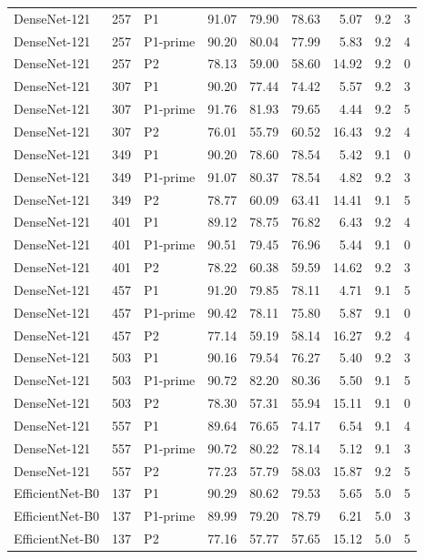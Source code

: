 {\begin{longtable}{lrlrrrrrr}
DenseNet-121 & 257 & P1 & 91.07 & 79.90 & 78.63 & 5.07 & 9.2 & 3 \\
DenseNet-121 & 257 & P1-prime & 90.20 & 80.04 & 77.99 & 5.83 & 9.2 & 4 \\
DenseNet-121 & 257 & P2 & 78.13 & 59.00 & 58.60 & 14.92 & 9.2 & 0 \\
DenseNet-121 & 307 & P1 & 90.20 & 77.44 & 74.42 & 5.57 & 9.2 & 3 \\
DenseNet-121 & 307 & P1-prime & 91.76 & 81.93 & 79.65 & 4.44 & 9.2 & 5 \\
DenseNet-121 & 307 & P2 & 76.01 & 55.79 & 60.52 & 16.43 & 9.2 & 4 \\
DenseNet-121 & 349 & P1 & 90.20 & 78.60 & 78.54 & 5.42 & 9.1 & 0 \\
DenseNet-121 & 349 & P1-prime & 91.07 & 80.37 & 78.54 & 4.82 & 9.2 & 3 \\
DenseNet-121 & 349 & P2 & 78.77 & 60.09 & 63.41 & 14.41 & 9.1 & 5 \\
DenseNet-121 & 401 & P1 & 89.12 & 78.75 & 76.82 & 6.43 & 9.2 & 4 \\
DenseNet-121 & 401 & P1-prime & 90.51 & 79.45 & 76.96 & 5.44 & 9.1 & 0 \\
DenseNet-121 & 401 & P2 & 78.22 & 60.38 & 59.59 & 14.62 & 9.2 & 3 \\
DenseNet-121 & 457 & P1 & 91.20 & 79.85 & 78.11 & 4.71 & 9.1 & 5 \\
DenseNet-121 & 457 & P1-prime & 90.42 & 78.11 & 75.80 & 5.87 & 9.1 & 0 \\
DenseNet-121 & 457 & P2 & 77.14 & 59.19 & 58.14 & 16.27 & 9.2 & 4 \\
DenseNet-121 & 503 & P1 & 90.16 & 79.54 & 76.27 & 5.40 & 9.2 & 3 \\
DenseNet-121 & 503 & P1-prime & 90.72 & 82.20 & 80.36 & 5.50 & 9.1 & 5 \\
DenseNet-121 & 503 & P2 & 78.30 & 57.31 & 55.94 & 15.11 & 9.1 & 0 \\
DenseNet-121 & 557 & P1 & 89.64 & 76.65 & 74.17 & 6.54 & 9.1 & 4 \\
DenseNet-121 & 557 & P1-prime & 90.72 & 80.22 & 78.14 & 5.12 & 9.1 & 3 \\
DenseNet-121 & 557 & P2 & 77.23 & 57.79 & 58.03 & 15.87 & 9.2 & 5 \\
EfficientNet-B0 & 137 & P1 & 90.29 & 80.62 & 79.53 & 5.65 & 5.0 & 5 \\
EfficientNet-B0 & 137 & P1-prime & 89.99 & 79.20 & 78.79 & 6.21 & 5.0 & 3 \\
EfficientNet-B0 & 137 & P2 & 77.16 & 57.77 & 57.65 & 15.12 & 5.0 & 5 \\

\end{longtable}}
